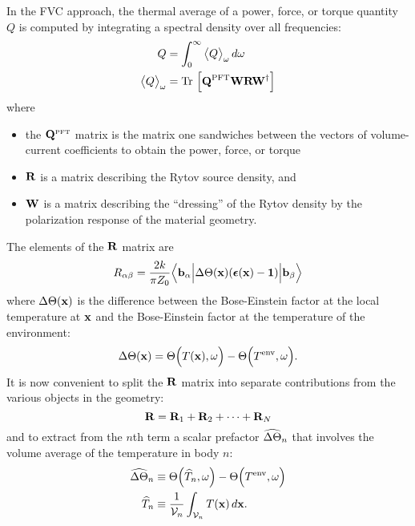 \documentclass[letterpaper]{article}
\newcommand{\vbeps}{\boldsymbol{\epsilon}}
\begin{document}
In the FVC approach, the thermal average of 
a power, force, or torque quantity $Q$ is 
computed by integrating a spectral density over all 
frequencies:
\begin{align*}
 Q &= \int_0^\infty \big\langle Q\big\rangle_\omega \, d\omega
\\
 \big\langle Q \big \rangle_\omega
   &=\text{Tr }\Big[\mathbf{Q}^{\hbox{\scriptsize{PFT}}} \mathbf{W} \mathbf{R} \mathbf{W}^\dagger\Big]
\end{align*}
where
\begin{itemize}
  \item the $\mathbf{Q}^{\hbox{\tiny{PFT}}}$ matrix is the matrix one sandwiches
        between the vectors of volume-current coefficients to 
        obtain the power, force, or torque
  \item $\mathbf{R}$ is a matrix describing the Rytov source density, and
  \item $\mathbf{W}$ is a matrix describing the ``dressing'' of the 
        Rytov density by the polarization response of the material
        geometry.
\end{itemize}
The elements of the $\mathbf{R}$ matrix are
$$ R_{\alpha\beta}=\frac{2k}{\pi Z_0}
   \EXPTWO{\vb b_\alpha}{ \Delta\Theta(\vb x) (\vbeps(\vb x) - \vb 1)}{\vb b_\beta}
$$
where $\Delta\Theta(\mathbf{x})$ is the difference between the Bose-Einstein
factor at the local temperature at $\mathbf{x}$ and the Bose-Einstein
factor at the temperature of the environment:
$$\Delta\Theta(\mathbf{x}) = \Theta\Big( T(\mathbf{x}), \omega \Big) 
                       -\Theta\Big( T^{\hbox{\scriptsize{env}}}, \omega \Big).
$$
It is now convenient to split the $\mathbf{R}$ matrix into separate
contributions from the various objects in the geometry:
$$ \mathbf{R} = \mathbf{R}_1 + \mathbf{R}_2 + \cdots + \mathbf{R}_{N} $$
and to extract from the $n$th term a scalar
prefactor $\widehat{\Delta\Theta}_n$ that involves the 
volume average of the temperature in body $n$:
\begin{align*}
 \widehat{\Delta\Theta}_n 
&\equiv \Theta\Big( \widehat{T}_n, \omega \Big) - 
        \Theta\Big( T^{\hbox{\scriptsize{env}}}, \omega \Big)
\\
\widehat{T}_n 
&\equiv 
   \frac{1}{\mathcal{V}_n} \int_{\mathcal{V}_n} T(\mathbf{x}) \, d\mathbf{x}.
\end{align*}
\end{document}
